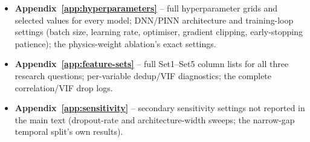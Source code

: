 \documentclass[11pt,a4paper]{report}
\begin{document}
\begin{itemize}
\setlength\itemsep{0pt}
\item \textbf{Appendix~\ref{app:hyperparameters}} -- full hyperparameter grids and selected
  values for every model; DNN/PINN architecture and training-loop settings (batch size, learning
  rate, optimiser, gradient clipping, early-stopping patience); the physics-weight ablation's
  exact settings.
\item \textbf{Appendix~\ref{app:feature-sets}} -- full Set1--Set5 column lists for all three
  research questions; per-variable dedup/VIF diagnostics; the complete correlation/VIF drop logs.
\item \textbf{Appendix~\ref{app:sensitivity}} -- secondary sensitivity settings not reported in
  the main text (dropout-rate and architecture-width sweeps; the narrow-gap temporal split's own
  results).
\end{itemize}

\end{document}
